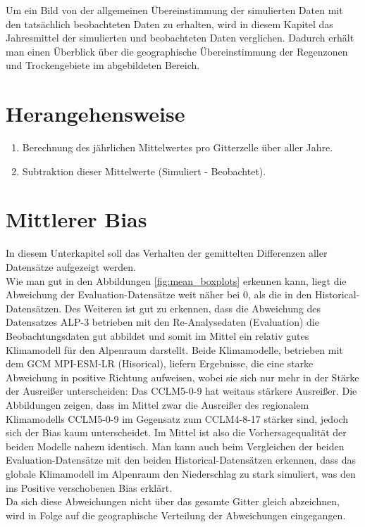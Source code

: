 Um ein Bild von der allgemeinen Übereinstimmung der simulierten Daten mit den tatsächlich beobachteten Daten zu erhalten, wird in diesem Kapitel das Jahresmittel der simulierten und beobachteten Daten verglichen. Dadurch erhält man einen Überblick über die geographische Übereinstimmung der Regenzonen und Trockengebiete im abgebildeten Bereich.
\section{Herangehensweise}
\begin{enumerate}
	\item Berechnung des jährlichen Mittelwertes pro Gitterzelle über aller Jahre.
	\item Subtraktion dieser Mittelwerte (Simuliert - Beobachtet).	
\end{enumerate}
\section{Mittlerer Bias}
In diesem Unterkapitel soll das Verhalten der gemittelten Differenzen aller Datensätze aufgezeigt werden.\\
Wie man gut in den Abbildungen \ref{fig:mean_boxplots} erkennen kann, liegt die Abweichung der Evaluation-Datensätze weit näher bei 0, als die in den Historical-Datensätzen. Des Weiteren ist gut zu erkennen, dass die Abweichung des Datensatzes ALP-3 betrieben mit den Re-Analysedaten (Evaluation) die Beobachtungsdaten gut abbildet und somit im Mittel ein relativ gutes Klimamodell für den Alpenraum darstellt.
Beide Klimamodelle, betrieben mit dem GCM MPI-ESM-LR (Hisorical), liefern Ergebnisse, die eine starke Abweichung in positive Richtung aufweisen, wobei sie sich nur mehr in der Stärke der Ausreißer unterscheiden: Das CCLM5-0-9 hat weitaus stärkere Ausreißer. Die Abbildungen zeigen, dass im Mittel zwar die Ausreißer des regionalem Klimamodells CCLM5-0-9 im Gegensatz zum CCLM4-8-17 stärker sind, jedoch sich der Bias kaum unterscheidet. Im Mittel ist also die Vorhersagequalität der beiden Modelle nahezu identisch. Man kann auch beim Vergleichen der beiden Evaluation-Datensätze mit den beiden Historical-Datensätzen erkennen, dass das globale Klimamodell im Alpenraum den Niederschlag zu stark simuliert, was den ins Positive verschobenen Bias erklärt.\\
Da sich diese Abweichungen nicht über das gesamte Gitter gleich abzeichnen, wird in Folge auf die geographische Verteilung der Abweichungen eingegangen.

